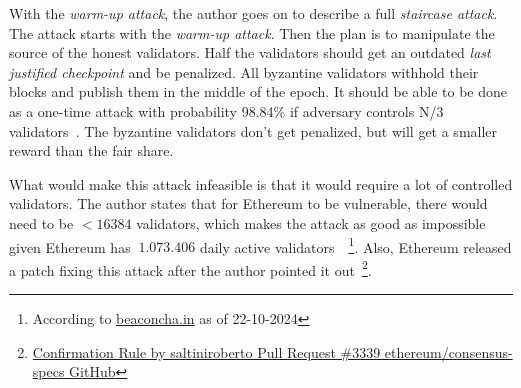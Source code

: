With the \textit{warm-up attack}, the author goes on to describe a full \textit{staircase attack}.
The attack starts with the \textit{warm-up attack}.
Then the plan is to manipulate the source of the honest validators.
Half the validators should get an outdated \textit{last justified checkpoint} and be penalized.
All byzantine validators withhold their blocks and publish them in the middle of the epoch.
It should be able
to be done as a one-time attack with probability 98.84\%
if adversary controls N/3 validators~\cite{cryptoeprint:2023/1622}.
The byzantine validators don't get penalized, but will get a smaller reward than the fair share.

What would make this attack infeasible is that it would require a lot of controlled validators.
The author states that for Ethereum to be vulnerable, there would need to be $<16384$ validators,
which makes the attack as good as impossible given Ethereum has $~1.073.406$ daily active validators~\cite{cryptoeprint:2023/1622}~\footnote{According to \href{https://beaconcha.in/charts/validators}{beaconcha.in} as of 22-10-2024}.
Also,
Ethereum released a patch
fixing this attack after the author pointed it out~\footnote{\href{https://github.com/ethereum/consensus-specs/pull/3339\#issuecomment-1637117341}{Confirmation Rule by saltiniroberto Pull Request \#3339 ethereum/consensus-specs GitHub}}.